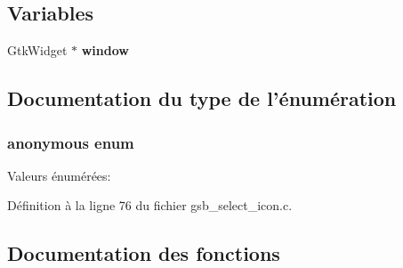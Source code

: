 \subsection*{Variables}
\begin{DoxyCompactItemize}
\item 
GtkWidget $\ast$ {\bf window}
\end{DoxyCompactItemize}


\subsection{Documentation du type de l'énumération}
\subsubsection[{"@8}]{\setlength{\rightskip}{0pt plus 5cm}anonymous enum}\label{gsb__select__icon_8c_abed82baf7f470b522273a3e37c24c600}
\begin{Desc}
\item[Valeurs énumérées: ]\par
\begin{description}
\item[{\em 
PIXBUF\_\-COLUMN\label{gsb__select__icon_8c_abed82baf7f470b522273a3e37c24c600ad5773b33de3127004005e25c37e7cd85}
}]\item[{\em 
TEXT\_\-COLUMN\label{gsb__select__icon_8c_abed82baf7f470b522273a3e37c24c600a658268753d26e20db642708403b7e96c}
}]\item[{\em 
DATA\_\-COLUMN\label{gsb__select__icon_8c_abed82baf7f470b522273a3e37c24c600a6257e1000f37ae514535623b59b0ecaa}
}]\end{description}
\end{Desc}



Définition à la ligne 76 du fichier gsb\_\-select\_\-icon.c.



\subsection{Documentation des fonctions}

